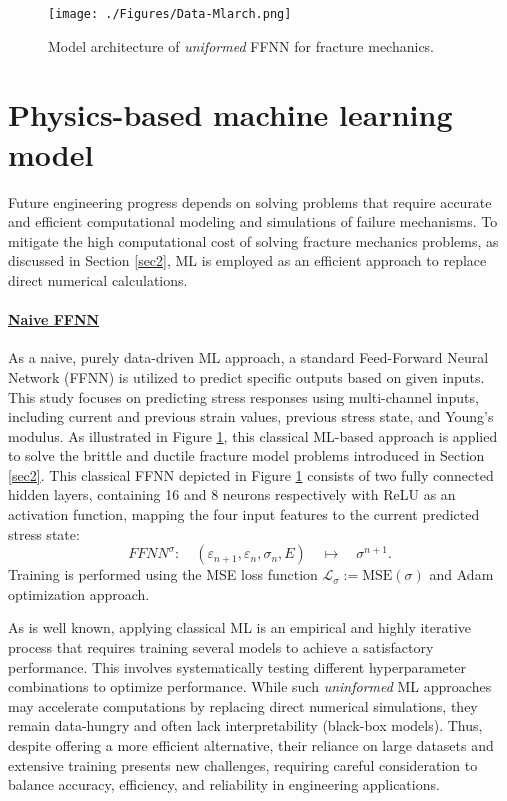 \documentclass[final,3p,times]{elsarticle}
\begin{document}
%
\begin{figure}[t]%
\centering
%
\texttt{[image: ./Figures/Data-Mlarch.png]} \;
%
\caption{Model architecture of \emph{uniformed} FFNN for fracture mechanics.}
\label{Classical-ML}%
\end{figure}%
%



\section{Physics-based machine learning model}
\label{sec4}
Future engineering progress depends on solving problems that require accurate and efficient computational modeling and simulations of failure mechanisms. To mitigate the high computational cost of solving fracture mechanics problems, as discussed in Section \ref{sec2}, ML is employed as an efficient approach to replace direct numerical calculations. 

\paragraph*{\underline{\textbf{Naive FFNN}}}
%
As a naive, purely data-driven ML approach, a standard Feed-Forward Neural Network (FFNN) is utilized to predict specific outputs based on given inputs. This study focuses on predicting stress responses using multi-channel inputs, including current and previous strain values, previous stress state, and Young's modulus. As illustrated in Figure \ref{Classical-ML}, this classical ML-based approach is applied to solve the brittle and ductile fracture model problems introduced in Section 
\ref{sec2}. This classical FFNN depicted in Figure \ref{Classical-ML} consists of two fully connected hidden layers, containing 16 and 8 neurons respectively with ReLU as an activation function, mapping the four input features to the current predicted stress state: 
\begin{equation}
    FFNN^{\sigma} : \quad  
    (\varepsilon_{n+1}, \varepsilon_n, \sigma_n, E)  
    \quad \longmapsto \quad  
    \sigma^{n+1}.
\end{equation}
Training is performed using the MSE loss function $\mathcal{L}_\sigma := \text{MSE}(\sigma)$ and Adam optimization approach.

As is well known, applying classical ML is an empirical and highly iterative process that requires training several models to achieve a satisfactory performance. This involves systematically testing different hyperparameter combinations to optimize performance. While such \emph{uninformed} ML approaches may accelerate computations by replacing direct numerical simulations, they remain data-hungry and often lack interpretability (black-box models). Thus, despite offering a more efficient alternative, their reliance on large datasets and extensive training presents new challenges, requiring careful consideration to balance accuracy, efficiency, and reliability in engineering applications. 
\end{document}
